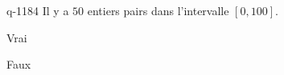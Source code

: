 \begin{truefalse}{q-1184}
Il y a $50$ entiers pairs dans l'intervalle $[0,100]$.
\item Vrai
\item* Faux
\end{truefalse}

